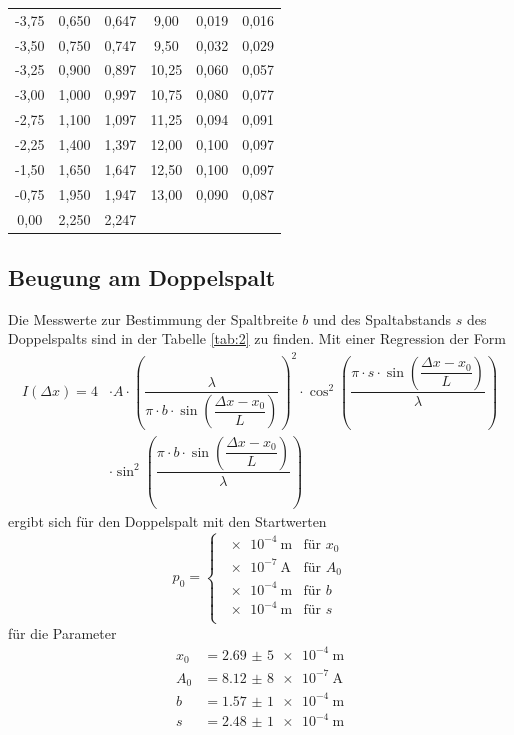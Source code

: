 \begin{table}[H]
\begin{tabular}{| c | c |c||c|c|c| }
		-3,75 	&0,650	&0,647	&9,00	&0,019	&0,016\\
		-3,50 	&0,750	&0,747	&9,50	&0,032	&0,029\\
		-3,25 	&0,900	&0,897	&10,25	&0,060	&0,057\\
		-3,00 	&1,000	&0,997	&10,75	&0,080	&0,077\\
		-2,75 	&1,100	&1,097	&11,25	&0,094	&0,091\\
		-2,25 	&1,400	&1,397	&12,00	&0,100	&0,097\\
		-1,50 	&1,650	&1,647	&12,50	&0,100	&0,097\\
		-0,75 	&1,950	&1,947	&13,00	&0,090	&0,087\\
		 0,00  &	2,250&	2,247& &&\\			


		\bottomrule
	\end{tabular}
  \end{table}
  \noindent



\subsection{Beugung am Doppelspalt}
Die Messwerte zur Bestimmung der Spaltbreite $b$ und des Spaltabstands $s$ des Doppelspalts sind in der Tabelle \ref{tab:2}  zu finden.
Mit einer Regression der Form 
\[
\begin{split}
I(\Delta x)=4&\cdot A\cdot \left(
\dfrac{\lambda}{\pi\cdot b\cdot\sin{\left(\dfrac{\Delta x-x_0}{L}\right)}}\right)^2\cdot\cos^2{\left(\dfrac{\pi\cdot s\cdot \sin{\left(\dfrac{\Delta x-x_0}{L}\right)}}{\lambda}\right)}\\
&\cdot\sin^2{\left(\dfrac{\pi\cdot b\cdot\sin{\left(\dfrac{\Delta x-x_0}{L}\right)}}{\lambda}\right)}
\end{split}
\]
ergibt sich für den Doppelspalt mit den Startwerten
\begin{equation*}
p_0=
\begin{cases}
\SI{e-4}{\metre}		& \text{für } x_0\\
\SI{e-7}{\ampere}		& \text{für } A_0\\
\SI{e-4}{\metre}		& \text{für } b\\
\SI{e-4}{\metre}		& \text{für } s\\
\end{cases}
\end{equation*}
für die Parameter
\begin{align*}
x_{0} &= \SI{2,69(5)e-4}{\metre}\\
A_0 &= \SI{8,12(8)e-7}{\ampere}\\
b	  &= \SI{1,57(1)e-4}{\metre}\\
s	  &= \SI{2,48(1)e-4}{\metre}\\
\end{align*}



